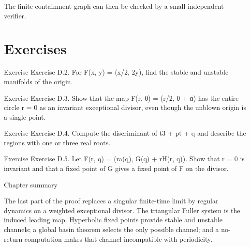 The finite containment graph can then be checked by a small independent verifier.


\section{Exercises}

\begin{statementbox}{Exercise}
Exercise D.2. For F(x, y) = (x/2, 2y), find the stable and unstable manifolds of the origin.
\end{statementbox}

\begin{statementbox}{Exercise}
Exercise D.3. Show that the map F(r, θ) = (r/2, θ + α) has the entire circle r = 0 as an invariant exceptional divisor, even though the unblown origin is a single point.
\end{statementbox}

\begin{statementbox}{Exercise}
Exercise D.4. Compute the discriminant of t3 + pt + q and describe the regions with one or three real roots.
\end{statementbox}

\begin{statementbox}{Exercise}
Exercise D.5. Let F(r, q) = (ra(q), G(q) + rH(r, q)). Show that r = 0 is invariant and that a fixed point of G gives a fixed point of F on the divisor.
\end{statementbox}

\begin{insightbox}{Chapter summary}
\end{insightbox}

The last part of the proof replaces a singular finite-time limit by regular dynamics on a weighted exceptional divisor. The triangular Fuller system is the induced leading map. Hyperbolic fixed points provide stable and unstable channels; a global basin theorem selects the only possible channel; and a no-return computation makes that channel incompatible with periodicity.

